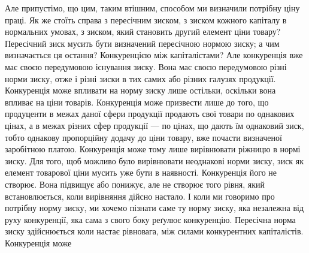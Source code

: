 Але припустімо, що цим, таким втішним, способом ми визначили потрібну
ціну праці. Як же стоїть справа з пересічним зиском, з зиском кожного капіталу
в нормальних умовах, з зиском, який становить другий елемент ціни товару?
Пересічний зиск мусить бути визначений пересічною нормою зиску; а чим визначається
ця остання? Конкуренцією між капіталістами? Але конкуренція вже має
своєю передумовою існування зиску. Вона має своєю передумовою різні
норми зиску, отже і різні зиски в тих самих або різних галузях продукції. Конкуренція
може впливати на норму зиску лише остільки, оскільки вона впливає на
ціни товарів. Конкуренція може призвести лише до того, що продуценти в межах
даної сфери продукції продають свої товари по однакових цінах, а в межах різних
сфер продукції — по цінах, що дають їм однаковий зиск, тобто однакову пропорційну
додачу до ціни товару, вже почасти визначеної заробітною платою.
Конкуренція може тому лише вирівнювати ріжницю в нормі зиску. Для того,
щоб можливо було вирівнювати неоднакові норми зиску, зиск як елемент товарової
ціни мусить уже бути в наявності. Конкуренція його не створює. Вона
підвищує або понижує, але не створює того рівня, який встановлюється, коли
вирівняння дійсно настало. І коли ми говоримо про потрібну норму зиску, ми
хочемо пізнати саме ту норму зиску, яка незалежна від руху конкуренції, яка
сама з свого боку реґулює конкуренцію. Пересічна норма зиску здійснюється
коли настає рівновага, між силами конкурентних капіталістів. Конкуренція може
\parbreak{}  %
